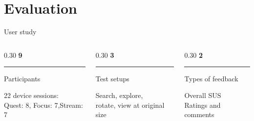 \section{Evaluation}
\begin{frame}[c]{User study}
\begin{columns}[T,onlytextwidth]
\begin{column}{0.30\textwidth}
\textcolor{unired}{\LARGE\textbf{9}}
\textcolor{unimint}{\rule{\linewidth}{1.6pt}}
\large Participants

\vspace{0.2cm}
\small 22 device sessions:\\Quest: 8, Focus: 7,\newline Stream: 7
\end{column}
\begin{column}{0.30\textwidth}
\textcolor{unired}{\LARGE\textbf{3}}
\textcolor{unimint}{\rule{\linewidth}{1.6pt}}
\large Test setups

\vspace{0.2cm}
\small Search, explore,\\rotate, view at original size
\end{column}
\begin{column}{0.30\textwidth}
\textcolor{unired}{\LARGE\textbf{2}}
\textcolor{unimint}{\rule{\linewidth}{1.6pt}}
\large Types of feedback

\vspace{0.2cm}
\small Overall SUS\\Ratings and comments
\end{column}
\end{columns}
\end{frame}
